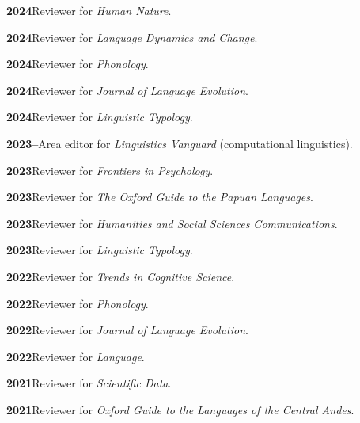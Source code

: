 \documentclass[11pt]{article}
\newcommand{\hangpara}{
 \setlength{\parindent}{0in} %
 \hangindent=0.42in %
}
\begin{document}
\vskip 6pt
\hangpara
{\bf 2024}\hspace{1ex}Reviewer for \textit{Human Nature}.

\vskip 6pt
\hangpara
{\bf 2024}\hspace{1ex}Reviewer for \textit{Language Dynamics and Change}.

\vskip 6pt
\hangpara
{\bf 2024}\hspace{1ex}Reviewer for \textit{Phonology}.

\vskip 6pt
\hangpara
{\bf 2024}\hspace{1ex}Reviewer for \textit{Journal of Language Evolution}.

\vskip 6pt
\hangpara
{\bf 2024}\hspace{1ex}Reviewer for \textit{Linguistic Typology}.

\vskip 6pt
\hangpara
{\bf 2023--}\hspace{1ex}Area editor for \textit{Linguistics Vanguard} (computational linguistics).

\vskip 6pt
\hangpara
{\bf 2023}\hspace{1ex}Reviewer for \textit{Frontiers in Psychology}.

\vskip 6pt
\hangpara
{\bf 2023}\hspace{1ex}Reviewer for \textit{The Oxford Guide to the Papuan Languages}.

\vskip 6pt
\hangpara
{\bf 2023}\hspace{1ex}Reviewer for \textit{Humanities and Social Sciences Communications}.

\vskip 6pt
\hangpara
{\bf 2023}\hspace{1ex}Reviewer for \textit{Linguistic Typology}.

\vskip 6pt
\hangpara
{\bf 2022}\hspace{1ex}Reviewer for \textit{Trends in Cognitive Science}.

\vskip 6pt
\hangpara
{\bf 2022}\hspace{1ex}Reviewer for \textit{Phonology}.

\vskip 6pt
\hangpara
{\bf 2022}\hspace{1ex}Reviewer for \textit{Journal of Language Evolution}.

\vskip 6pt
\hangpara
{\bf 2022}\hspace{1ex}Reviewer for \textit{Language}.

\vskip 6pt
\hangpara
{\bf 2021}\hspace{1ex}Reviewer for \textit{Scientific Data}.

\vskip 6pt
\hangpara
{\bf 2021}\hspace{1ex}Reviewer for \textit{Oxford Guide to the Languages of the Central Andes}.
\end{document}
